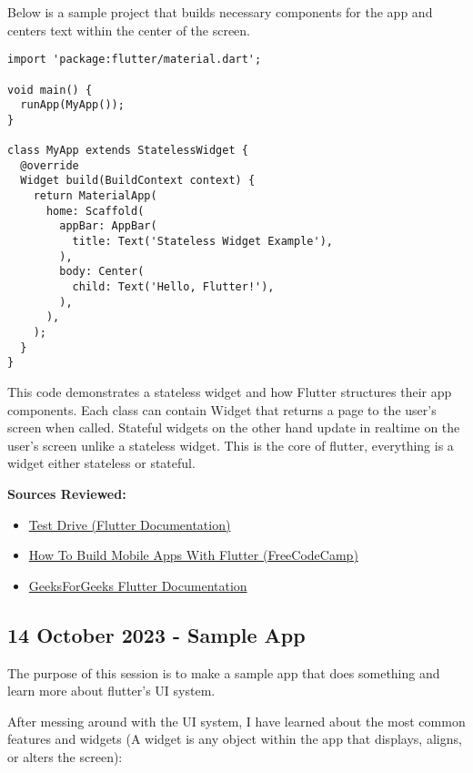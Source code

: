 \documentclass{article}
\begin{document}
Below is a sample project that builds necessary components for the app and centers text within the center of the screen.

\begin{lstlisting}[style=dartstyle]
import 'package:flutter/material.dart';

void main() {
  runApp(MyApp());
}

class MyApp extends StatelessWidget {
  @override
  Widget build(BuildContext context) {
    return MaterialApp(
      home: Scaffold(
        appBar: AppBar(
          title: Text('Stateless Widget Example'),
        ),
        body: Center(
          child: Text('Hello, Flutter!'),
        ),
      ),
    );
  }
}
\end{lstlisting}

This code demonstrates a stateless widget and how Flutter structures their app components. Each class can contain Widget that returns a page to the user's screen when called. Stateful widgets on the other hand update in realtime on the user's screen unlike a stateless widget. This is the core of flutter, everything is a widget either stateless or stateful. 

\textbf{Sources Reviewed:}

\begin{itemize}
	\item \href{https://docs.flutter.dev/get-started/test-drive}{Test Drive (Flutter Documentation)}
	\item \href{https://www.freecodecamp.org/news/how-to-build-mobile-apps-with-flutter/}{How To Build Mobile Apps With Flutter (FreeCodeCamp)}
	\item \href{https://www.geeksforgeeks.org/flutter-tutorial/}{GeeksForGeeks Flutter Documentation}
\end{itemize}



\newpage
\subsection{14 October 2023 - Sample App}

The purpose of this session is to make a sample app that does something and learn more about flutter's UI system.

After messing around with the UI system, I have learned about the most common features and widgets (A widget is any object within the app that displays, aligns, or alters the screen):
\end{document}
